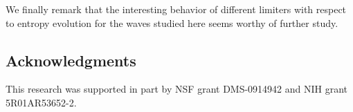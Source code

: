 We finally remark that the interesting behavior of different limiters
with respect to entropy evolution for the waves studied here seems
worthy of further study.



\subsection*{Acknowledgments}
This research was supported in part by NSF grant DMS-0914942 and NIH grant
5R01AR53652-2.

